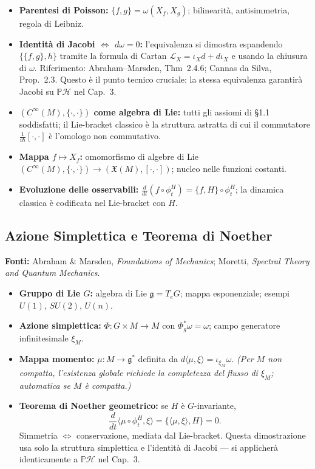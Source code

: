 \documentclass[12pt, a4paper]{article}
\newcommand{\fonti}[1]{%
	\begin{fontebox}
		\textcolor{fontecolor}{\footnotesize\textbf{Fonti:} #1}
	\end{fontebox}%
}
\begin{document}
	\begin{itemize}
		\item \textbf{Parentesi di Poisson:} $\{f,g\}=\omega(X_f,X_g)$; bilinearità,
		antisimmetria, regola di Leibniz.
		\item \textbf{Identità di Jacobi $\Leftrightarrow$ $d\omega=0$:} l'equivalenza
		si dimostra espandendo $\{\{f,g\},h\}$ tramite la formula di Cartan
		$\mathcal{L}_X=\iota_X d+d\iota_X$ e usando la chiusura di $\omega$. Riferimento:
		Abraham--Marsden, Thm~2.4.6; Cannas da Silva, Prop.~2.3. Questo è il punto
		tecnico cruciale: la stessa equivalenza garantirà Jacobi su $\mathbb{P}\mathcal{H}$
		nel Cap.~3.
		\item \textbf{$(C^\infty(M),\{\cdot,\cdot\})$ come algebra di Lie:} tutti gli
		assiomi di \S1.1 soddisfatti; il Lie-bracket classico è la struttura astratta
		di cui il commutatore $\frac{1}{i\hbar}[\cdot,\cdot]$ è l'omologo non commutativo.
		\item \textbf{Mappa $f\mapsto X_f$:} omomorfismo di algebre di Lie
		$(C^\infty(M),\{\cdot,\cdot\})\to(\mathfrak{X}(M),[\cdot,\cdot])$; nucleo nelle
		funzioni costanti.
		\item \textbf{Evoluzione delle osservabili:} $\tfrac{d}{dt}(f\circ\phi_t^H)=
		\{f,H\}\circ\phi_t^H$; la dinamica classica è codificata nel Lie-bracket con $H$.
	\end{itemize}
	
	\subsection{Azione Simplettica e Teorema di Noether}
	
	\fonti{Abraham \& Marsden, \textit{Foundations of Mechanics};
		Moretti, \textit{Spectral Theory and Quantum Mechanics}.}
	
	\begin{itemize}
		\item \textbf{Gruppo di Lie $G$:} algebra di Lie $\mathfrak{g}=T_eG$; mappa
		esponenziale; esempi $U(1)$, $SU(2)$, $U(n)$.
		\item \textbf{Azione simplettica:} $\Phi:G\times M\to M$ con $\Phi_g^*\omega=\omega$;
		campo generatore infinitesimale $\xi_M$.
		\item \textbf{Mappa momento:} $\mu:M\to\mathfrak{g}^*$ definita da
		$d\langle\mu,\xi\rangle=\iota_{\xi_M}\omega$. \emph{(Per $M$ non compatta,
			l'esistenza globale richiede la completezza del flusso di $\xi_M$; automatica
			se $M$ è compatta.)}
		\item \textbf{Teorema di Noether geometrico:} se $H$ è $G$-invariante,
		\[
		\frac{d}{dt}\langle\mu\circ\phi_t^H,\xi\rangle = \{\langle\mu,\xi\rangle,H\} = 0.
		\]
		Simmetria $\Leftrightarrow$ conservazione, mediata dal Lie-bracket. Questa
		dimostrazione usa solo la struttura simplettica e l'identità di Jacobi --- si
		applicherà identicamente a $\mathbb{P}\mathcal{H}$ nel Cap.~3.
	\end{itemize}
	
\end{document}
